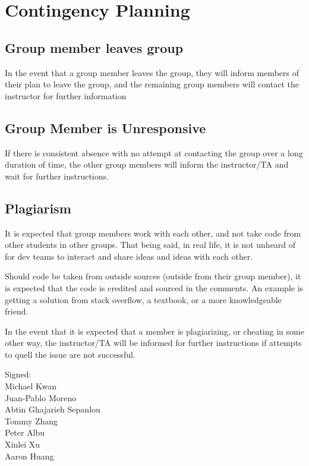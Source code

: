 \documentclass[hidelinks, 12pt]{article}    %
\begin{document}
    \section{Contingency Planning}
        \subsection{Group member leaves group}
            In the event that a group member leaves the group, they will inform members of their plan
            to leave the group, and the remaining group members will contact the instructor for further
            information
            
        \subsection{Group Member is Unresponsive}
            If there is consistent absence with no attempt at contacting the group over a long
            duration of time, the other group members will inform the instructor/TA and wait for further
            instructions.
        
        \subsection{Plagiarism}
            It is expected that group members work with each other, and not take code from other
            students in other groups. That being said, in real life, it is not unheard of for dev teams
            to interact and share ideas and ideas with each other.

            Should code be taken from outside sources (outside from their group member), it is expected that
            the code is credited and sourced in the comments. An example is getting a solution
            from stack overflow, a textbook, or a more knowledgeable friend.
            
            In the event that it is expected that a member is plagiarizing, or cheating in some other way,
            the instructor/TA will be informed for further instructions if attempts to quell the issue
            are not successful.
            
    
    Signed: \\
    Michael Kwan \\
    Juan-Pablo Moreno \\
    Abtin Ghajarieh Sepanlou \\
    Tommy Zhang \\
    Peter Albu \\
    Xinlei Xu \\
    Aaron Huang \\
\end{document}
